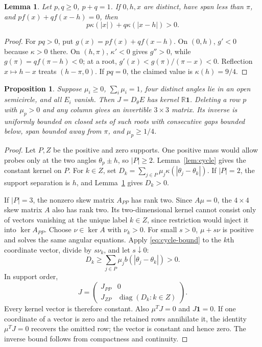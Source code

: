 \documentclass[11pt,a4paper]{article}
\numberwithin{equation}{section}
\newtheorem{proposition}[theorem]{Proposition}
\newtheorem{lemma}[theorem]{Lemma}
\theoremstyle{remark}
\newcommand{\R}{\mathbb R}
\newcommand{\one}{\boldsymbol{1}}
\newcommand{\diag}{\operatorname{diag}}
\begin{document}
\begin{lemma}\label{lem:probe}
Let $p,q\ge0$, $p+q=1$. If $0,h,x$ are distinct, have span less than $\pi$, and
$pf(x)+qf(x-h)=0$, then
\[
 p\kappa(|x|)+q\kappa(|x-h|)>0.
\]
\end{lemma}
\begin{proof}
For $pq>0$, put $g(x)=pf(x)+qf(x-h)$. On $(0,h)$, $g'<0$ because $\kappa>0$ there. On $(h,\pi)$, $\kappa'<0$ gives $g''>0$, while $g(\pi)=qf(\pi-h)<0$; at a root,
$g'(x)<g(\pi)/(\pi-x)<0$. Reflection $x\mapsto h-x$ treats $(h-\pi,0)$.
If $pq=0$, the claimed value is $\kappa(h)=9/4$.
\end{proof}

\begin{proposition}\label{prop:closed}
Suppose $\mu_i\ge0$, $\sum_i\mu_i=1$, four distinct angles lie in an open semicircle, and all $E_i$ vanish. Then $J=D_\theta E$ has kernel $\R\one$.
Deleting a row $p$ with $\mu_p>0$ and any column gives an invertible $3\times3$ matrix. Its inverse is uniformly bounded on closed sets of such roots with consecutive gaps bounded below, span bounded away from $\pi$, and $\mu_p\ge1/4$.
\end{proposition}
\begin{proof}
Let $P,Z$ be the positive and zero supports. One positive mass would allow probes only at the two angles $\theta_p\pm h$, so $|P|\ge2$. Lemma~\ref{lem:cycle} gives the constant kernel on $P$. For $k\in Z$, set
$D_k=\sum_{j\in P}\mu_j\kappa(|\theta_j-\theta_k|)$.
If $|P|=2$, the support separation is $h$, and Lemma~\ref{lem:probe} gives $D_k>0$.

If $|P|=3$, the nonzero skew matrix $A_{PP}$ has rank two. Since $A\mu=0$, the $4\times4$ skew matrix $A$ also has rank two. Its two-dimensional kernel cannot consist only of vectors vanishing at the unique label $k\in Z$, since restriction would inject it into $\ker A_{PP}$. Choose $\nu\in\ker A$ with $\nu_k>0$. For small $s>0$, $\mu+s\nu$ is positive and solves the same angular equations. Apply \eqref{eq:cycle-bound} to the $k$th coordinate vector, divide by $s\nu_k$, and let $s\downarrow0$:
\[
 D_k\ge\sum_{j\in P}\mu_j b(|\theta_j-\theta_k|)>0.
\]
In support order,
\[
 J=\begin{pmatrix}J_{PP}&0\\J_{ZP}&\diag(D_k:k\in Z)\end{pmatrix}.
\]
Every kernel vector is therefore constant. Also $\mu^TJ=0$ and $J\one=0$.
If one coordinate of a vector is zero and the retained rows annihilate it, the identity $\mu^TJ=0$ recovers the omitted row; the vector is constant and hence zero. The inverse bound follows from compactness and continuity.
\end{proof}
\end{document}
